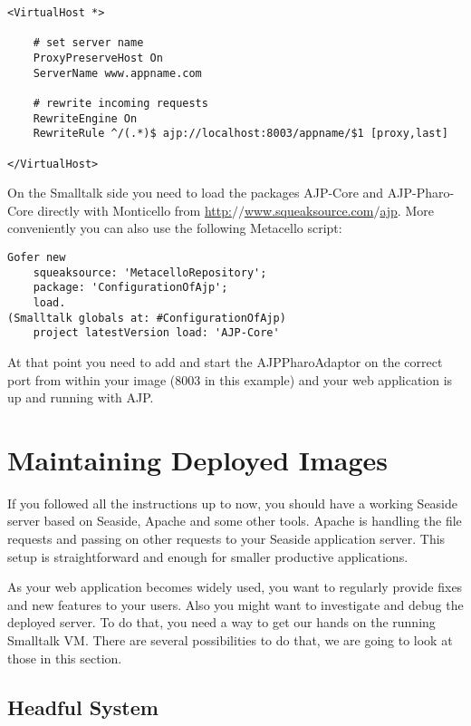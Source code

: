 \documentclass[a4paper,10pt,twoside]{book}
\newcommand{\ct}[1]{{\small\ttfamily\textup{#1}}}
\begin{document}
\begin{lstlisting}
<VirtualHost *>

    # set server name
    ProxyPreserveHost On
    ServerName www.appname.com

    # rewrite incoming requests
    RewriteEngine On
    RewriteRule ^/(.*)$ ajp://localhost:8003/appname/$1 [proxy,last]

</VirtualHost>
\end{lstlisting}

On the Smalltalk side you need to load the packages \ct{AJP-Core} and \ct{AJP-Pharo-Core} directly with Monticello from \href{http://www.squeaksource.com/ajp}{http:$/$$/$www.squeaksource.com$/$ajp}. More conveniently you can also use the following Metacello script:

\begin{lstlisting}
Gofer new
    squeaksource: 'MetacelloRepository';
    package: 'ConfigurationOfAjp';
    load.
(Smalltalk globals at: #ConfigurationOfAjp)
    project latestVersion load: 'AJP-Core'
\end{lstlisting}

At that point you need to add and start the \ct{AJPPharoAdaptor} on the correct port from within your image (8003 in this example) and your web application is up and running with AJP.

\section{Maintaining Deployed Images}
\label{book:advanced:deployment:maintaining}

If you followed all the instructions up to now, you should have a working Seaside server based on Seaside, Apache and some other tools. Apache is handling the file requests and passing on other requests to your Seaside application server. This setup is straightforward and enough for smaller productive applications.

As your web application becomes widely used, you want to regularly provide fixes and new features to your users. Also you might want to investigate and debug the deployed server. To do that, you need a way to get our hands on the running Smalltalk VM. There are several possibilities to do that, we are going to look at those in this section.

\subsection{Headful System}
\label{book:advanced:deployment:maintaining:window}
\end{document}
